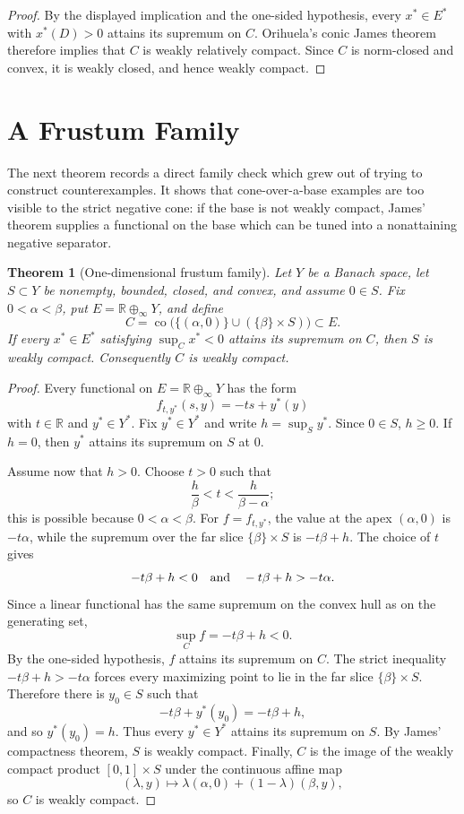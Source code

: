 \documentclass[11pt]{article}
\newtheorem{theorem}{Theorem}
\newcommand{\co}{\operatorname{co}}
\begin{document}
\begin{proof}
By the displayed implication and the one-sided hypothesis, every
\(x^\ast\in E^\ast\) with \(x^\ast(D)>0\) attains its supremum on \(C\).
Orihuela's conic James theorem \cite{Orihuela2016} therefore implies that
\(C\) is weakly relatively compact. Since \(C\) is norm-closed and convex,
it is weakly closed, and hence weakly compact.
\end{proof}

\section*{A Frustum Family}

The next theorem records a direct family check which grew out of trying to
construct counterexamples. It shows that cone-over-a-base examples are
too visible to the strict negative cone: if the base is not weakly
compact, James' theorem supplies a functional on the base which can be
tuned into a nonattaining negative separator.

\begin{theorem}[One-dimensional frustum family]
\label{thm:frustum}
Let \(Y\) be a Banach space, let \(S\subset Y\) be nonempty, bounded,
closed, and convex, and assume \(0\in S\). Fix \(0<\alpha<\beta\), put
\(E=\mathbb R\oplus_\infty Y\), and define
\[
  C=\co\bigl(\{(\alpha,0)\}\cup(\{\beta\}\times S)\bigr)\subset E.
\]
If every \(x^\ast\in E^\ast\) satisfying \(\sup_C x^\ast<0\) attains its
supremum on \(C\), then \(S\) is weakly compact. Consequently \(C\) is
weakly compact.
\end{theorem}

\begin{proof}
Every functional on \(E=\mathbb R\oplus_\infty Y\) has the form
\[
  f_{t,y^\ast}(s,y)=-ts+y^\ast(y)
\]
with \(t\in\mathbb R\) and \(y^\ast\in Y^\ast\). Fix \(y^\ast\in Y^\ast\)
and write \(h=\sup_S y^\ast\). Since \(0\in S\), \(h\geq 0\). If
\(h=0\), then \(y^\ast\) attains its supremum on \(S\) at \(0\).

Assume now that \(h>0\). Choose \(t>0\) such that
\[
  \frac{h}{\beta}<t<\frac{h}{\beta-\alpha};
\]
this is possible because \(0<\alpha<\beta\). For
\(f=f_{t,y^\ast}\), the value at the apex \((\alpha,0)\) is
\(-t\alpha\), while the supremum over the far slice
\(\{\beta\}\times S\) is \(-t\beta+h\). The choice of \(t\) gives
\[
  -t\beta+h<0
  \quad\hbox{and}\quad
  -t\beta+h>-t\alpha.
\]
Since a linear functional has the same supremum on the convex hull as on
the generating set,
\[
  \sup_C f=-t\beta+h<0.
\]
By the one-sided hypothesis, \(f\) attains its supremum on \(C\). The
strict inequality \(-t\beta+h>-t\alpha\) forces every maximizing point to
lie in the far slice \(\{\beta\}\times S\). Therefore there is
\(y_0\in S\) such that
\[
  -t\beta+y^\ast(y_0)=-t\beta+h,
\]
and so \(y^\ast(y_0)=h\). Thus every \(y^\ast\in Y^\ast\) attains its
supremum on \(S\). By James' compactness theorem, \(S\) is weakly compact.
Finally, \(C\) is the image of the weakly compact product
\([0,1]\times S\) under the continuous affine map
\[
  (\lambda,y)\mapsto \lambda(\alpha,0)+(1-\lambda)(\beta,y),
\]
so \(C\) is weakly compact.
\end{proof}
\end{document}
